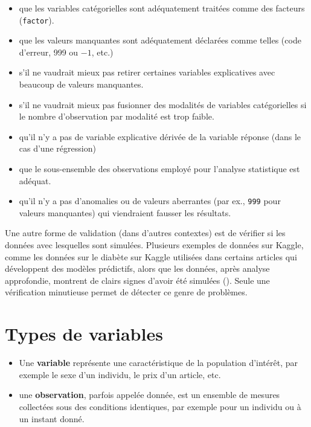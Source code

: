 \documentclass[
  11pt,
  letterpaper,
]{scrbook}
\providecommand{\tightlist}{%
  \setlength{\itemsep}{0pt}\setlength{\parskip}{0pt}}\usepackage{longtable,booktabs,array}
\theoremstyle{definition}
\theoremstyle{remark}
\begin{document}
\begin{itemize}
\tightlist
\item
  que les variables catégorielles sont adéquatement traitées comme des
  facteurs (\texttt{factor}).
\item
  que les valeurs manquantes sont adéquatement déclarées comme telles
  (code d'erreur, 999 ou \(-1\), etc.)
\item
  s'il ne vaudrait mieux pas retirer certaines variables explicatives
  avec beaucoup de valeurs manquantes.
\item
  s'il ne vaudrait mieux pas fusionner des modalités de variables
  catégorielles si le nombre d'observation par modalité est trop faible.
\item
  qu'il n'y a pas de variable explicative dérivée de la variable réponse
  (dans le cas d'une régression)
\item
  que le sous-ensemble des observations employé pour l'analyse
  statistique est adéquat.
\item
  qu'il n'y a pas d'anomalies ou de valeurs aberrantes (par ex.,
  \texttt{999} pour valeurs manquantes) qui viendraient fausser les
  résultats.
\end{itemize}

Une autre forme de validation (dans d'autres contextes) est de vérifier
si les données avec lesquelles sont simulées. Plusieurs exemples de
données sur Kaggle, comme les données sur le diabète sur Kaggle
utilisées dans certains articles qui développent des modèles prédictifs,
alors que les données, après analyse approfondie, montrent de clairs
signes d'avoir été simulées (). Seule une vérification minutieuse permet de détecter ce genre de
problèmes.

\section{Types de variables}\label{types-de-variables}

\begin{itemize}
\tightlist
\item
  Une \textbf{variable} représente une caractéristique de la population
  d'intérêt, par exemple le sexe d'un individu, le prix d'un article,
  etc.
\item
  une \textbf{observation}, parfois appelée donnée, est un ensemble de
  mesures collectées sous des conditions identiques, par exemple pour un
  individu ou à un instant donné.
\end{itemize}
\end{document}
